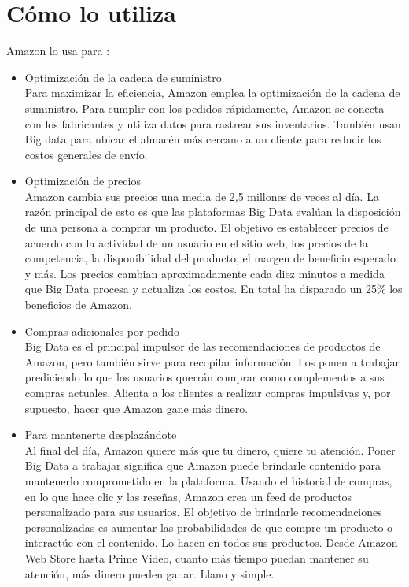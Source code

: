 \section{Cómo lo utiliza}
Amazon lo usa para :
\begin{itemize}
  \item Optimización de la cadena de suministro \\
Para maximizar la eficiencia, Amazon emplea la optimización de la cadena de suministro. Para cumplir con los pedidos rápidamente, Amazon se conecta con los fabricantes y utiliza datos para rastrear sus inventarios. También usan Big data para ubicar el almacén más cercano a un cliente para reducir los costos generales de envío.
  \item Optimización de precios\\
Amazon cambia sus precios una media de 2,5 millones de veces al día. La razón principal de esto es que las plataformas Big Data evalúan la disposición de una persona a comprar un producto. El objetivo es establecer precios de acuerdo con la actividad de un usuario en el sitio web, los precios de la competencia, la disponibilidad del producto, el margen de beneficio esperado y más. Los precios cambian aproximadamente cada diez minutos a medida que Big Data procesa y actualiza los costos. En total ha disparado un 25$\%$ los beneficios de Amazon.
  \item Compras adicionales por pedido\\
Big Data es el principal impulsor de las recomendaciones de productos de Amazon, pero también sirve para recopilar información. Los ponen a trabajar prediciendo lo que los usuarios querrán comprar como complementos a sus compras actuales. Alienta a los clientes a realizar compras impulsivas y, por supuesto, hacer que Amazon gane más dinero.
  \item  Para mantenerte desplazándote\\
Al final del día, Amazon quiere más que tu dinero, quiere tu atención. Poner Big Data a trabajar significa que Amazon puede brindarle contenido para mantenerlo comprometido en la plataforma. Usando el historial de compras, en lo que hace clic y las reseñas, Amazon crea un feed de productos personalizado para sus usuarios. El objetivo de brindarle recomendaciones personalizadas es aumentar las probabilidades de que compre un producto o interactúe con el contenido. Lo hacen en todos sus productos. Desde Amazon Web Store hasta Prime Video, cuanto más tiempo puedan mantener su atención, más dinero pueden ganar. Llano y simple.
\end{itemize}

